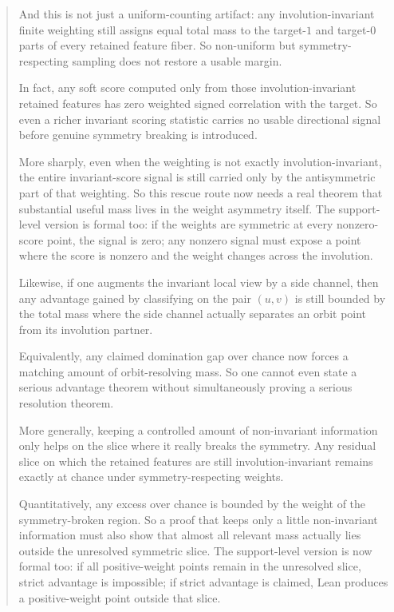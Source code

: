 \documentclass[11pt]{article}
\theoremstyle{remark}
\begin{document}
\begin{abstract}
And this is not just a uniform-counting artifact: any involution-invariant finite weighting still
assigns equal total mass to the target-\(1\) and target-\(0\) parts of every retained feature
fiber.  So non-uniform but symmetry-respecting sampling does not restore a usable margin.

In fact, any soft score computed only from those involution-invariant retained features has zero
weighted signed correlation with the target.  So even a richer invariant scoring statistic carries
no usable directional signal before genuine symmetry breaking is introduced.

More sharply, even when the weighting is not exactly involution-invariant, the entire invariant-score
signal is still carried only by the antisymmetric part of that weighting.  So this rescue route now
needs a real theorem that substantial useful mass lives in the weight asymmetry itself.  The
support-level version is formal too: if the weights are symmetric at every nonzero-score point, the
signal is zero; any nonzero signal must expose a point where the score is nonzero and the weight
changes across the involution.

Likewise, if one augments the invariant local view by a side channel, then any advantage gained by
classifying on the pair \((u,v)\) is still bounded by the total mass where the side channel actually
separates an orbit point from its involution partner.

Equivalently, any claimed domination gap over chance now forces a matching amount of orbit-resolving
mass.  So one cannot even state a serious advantage theorem without simultaneously proving a serious
resolution theorem.

More generally, keeping a controlled amount of non-invariant information only helps on the slice
where it really breaks the symmetry.  Any residual slice on which the retained features are still
involution-invariant remains exactly at chance under symmetry-respecting weights.

Quantitatively, any excess over chance is bounded by the weight of the
symmetry-broken region.  So a proof that keeps only a little non-invariant information must also
show that almost all relevant mass actually lies outside the unresolved symmetric slice.  The
support-level version is now formal too: if all positive-weight points remain in the unresolved
slice, strict advantage is impossible; if strict advantage is claimed, Lean produces a
positive-weight point outside that slice.


\end{abstract}
\end{document}
